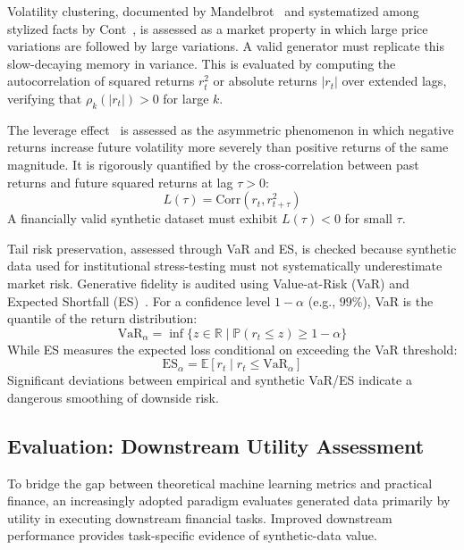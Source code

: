 \documentclass[11pt,a4paper]{article}
\begin{document}
Volatility clustering, documented by Mandelbrot~\citep{mandelbrot1963variation} and systematized among stylized facts by Cont~\citep{cont2001empirical}, is assessed as a market property in which large price variations are followed by large variations. A valid generator must replicate this slow-decaying memory in variance. This is evaluated by computing the autocorrelation of squared returns $r_t^2$ or absolute returns $|r_t|$ over extended lags, verifying that $\rho_k(|r_t|) > 0$ for large $k$.

The leverage effect~\citep{black1976studies,cont2001empirical} is assessed as the asymmetric phenomenon in which negative returns increase future volatility more severely than positive returns of the same magnitude. It is rigorously quantified by the cross-correlation between past returns and future squared returns at lag $\tau > 0$:
    \begin{equation}
        L(\tau) = \text{Corr}(r_t, r_{t+\tau}^2)
    \end{equation}
A financially valid synthetic dataset must exhibit $L(\tau) < 0$ for small $\tau$.

Tail risk preservation, assessed through VaR and ES, is checked because synthetic data used for institutional stress-testing must not systematically underestimate market risk. Generative fidelity is audited using Value-at-Risk (VaR) and Expected Shortfall (ES)~\citep{acerbi2002coherence,acerbi2014expected}. For a confidence level $1 - \alpha$ (e.g., $99\%$), VaR is the quantile of the return distribution:
    \begin{equation}
        \text{VaR}_\alpha = \inf \{ z \in \mathbb{R} \mid \mathbb{P}(r_t \le z) \ge 1 - \alpha \}
    \end{equation}
While ES measures the expected loss conditional on exceeding the VaR threshold:
    \begin{equation}
        \text{ES}_\alpha = \mathbb{E}[r_t \mid r_t \le \text{VaR}_\alpha]
    \end{equation}
Significant deviations between empirical and synthetic VaR/ES indicate a dangerous smoothing of downside risk.

\subsection{Evaluation: Downstream Utility Assessment}
To bridge the gap between theoretical machine learning metrics and practical finance, an increasingly adopted paradigm evaluates generated data primarily by utility in executing downstream financial tasks. Improved downstream performance provides task-specific evidence of synthetic-data value.
\end{document}
